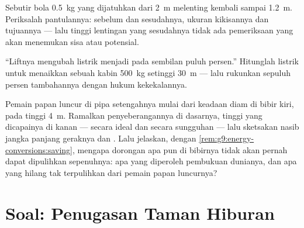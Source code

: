 \begin{exercise}[$\star\star$]\label{exo:g9:energy-conversions:10}
Sebutir bola \qty{0.5}{kg} yang dijatuhkan dari \qty{2}{m} melenting
kembali sampai \qty{1.2}{m}. Periksalah pantulannya:  sebelum
dan sesudahnya, ukuran kikisannya dan tujuannya --- lalu tinggi
lentingan yang sesudahnya tidak ada pemeriksaan yang akan menemukan
sisa  atau potensial.
\end{exercise}

\begin{exercise}[$\star\star$]\label{exo:g9:energy-conversions:11}
``Liftnya mengubah  listrik menjadi  pada
 sembilan puluh persen.'' Hitunglah  listrik untuk
menaikkan sebuah kabin \qty{500}{kg} setinggi \qty{30}{m} --- lalu
rukunkan sepuluh persen tambahannya dengan hukum kekekalannya.
\end{exercise}

\begin{exercise}[$\star\star\star$]\label{exo:g9:energy-conversions:12}
Pemain papan luncur di pipa setengahnya mulai dari keadaan diam di
bibir kiri, pada tinggi \qty{4}{m}. Ramalkan 
penyeberangannya di dasarnya, tinggi yang dicapainya di kanan ---
secara ideal dan secara sungguhan --- lalu sketsakan nasib jangka
panjang geraknya dan . Lalu jelaskan, dengan
\cref{rem:g9:energy-conversions:saving}, mengapa dorongan apa pun di
bibirnya tidak akan pernah dapat dipulihkan sepenuhnya: apa yang
diperoleh pembukuan dunianya, dan apa yang hilang tak terpulihkan dari
pemain papan luncurnya?
\end{exercise}

\section{Soal: Penugasan Taman Hiburan}

